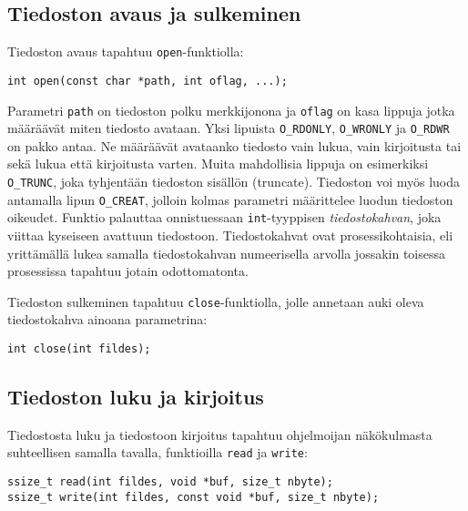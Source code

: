 \subsection{Tiedoston avaus ja sulkeminen}
Tiedoston avaus tapahtuu \texttt{open}-funktiolla:

\begin{verbatim}
int open(const char *path, int oflag, ...);
\end{verbatim}

Parametri \texttt{path} on tiedoston polku merkkijonona
ja \texttt{oflag} on kasa lippuja jotka määräävät miten tiedosto avataan.
Yksi lipuista \texttt{O\_RDONLY}, \texttt{O\_WRONLY} ja \texttt{O\_RDWR} on pakko antaa.
Ne määräävät avataanko tiedosto vain lukua, vain kirjoitusta tai sekä lukua että
kirjoitusta varten.
Muita mahdollisia lippuja on esimerkiksi \texttt{O\_TRUNC},
joka tyhjentään tiedoston sisällön (truncate).
Tiedoston voi myös luoda antamalla lipun \texttt{O\_CREAT},
jolloin kolmas parametri määrittelee luodun tiedoston oikeudet.
Funktio palauttaa onnistuessaan \texttt{int}-tyyppisen \emph{tiedostokahvan},
joka viittaa kyseiseen avattuun tiedostoon.
Tiedostokahvat ovat prosessikohtaisia,
eli yrittämällä lukea samalla tiedostokahvan numeerisella arvolla
jossakin toisessa prosessissa tapahtuu jotain odottomatonta.

Tiedoston sulkeminen tapahtuu \texttt{close}-funktiolla,
jolle annetaan auki oleva tiedostokahva ainoana parametrina:

\begin{verbatim}
int close(int fildes);
\end{verbatim}

\subsection{Tiedoston luku ja kirjoitus}

Tiedostosta luku ja tiedostoon kirjoitus tapahtuu ohjelmoijan näkökulmasta suhteellisen
samalla tavalla, funktioilla \texttt{read} ja \texttt{write}:

\begin{verbatim}
ssize_t read(int fildes, void *buf, size_t nbyte);
ssize_t write(int fildes, const void *buf, size_t nbyte);
\end{verbatim}

